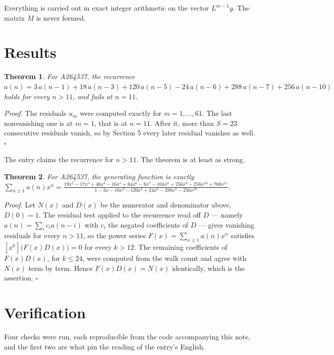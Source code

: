 \documentclass[11pt]{article}
\newtheorem{theorem}{Theorem}
\theoremstyle{definition}
\begin{document}
Everything is carried out in exact integer arithmetic on the vector $L^{m-1}y$. The matrix $M$ is never formed.

\section{Results}

\begin{theorem} For A264537, the recurrence $a(n) = 3\,a(n-1) + 18\,a(n-3) + 120\,a(n-5) - 24\,a(n-6) + 288\,a(n-7) + 256\,a(n-10)$ holds for every $n > 11$, and fails at $n = 11$.\end{theorem}

{\itshape Proof.} The residuals $u_m$ were computed exactly for $m = 1,\dots,61$. The last nonvanishing one is at $m = 1$, that is at $n = 11$. After it, more than $S = 23$ consecutive residuals vanish, so by Section 5 every later residual vanishes as well. $\square$

The entry claims the recurrence for $n > 11$. The theorem is at least as strong.

\begin{theorem} For A264537, the generating function is exactly $\sum_{n\ge 1} a(n)x^n = \frac{19x^{2} - 17x^{3} + 46x^{4} - 16x^{5} + 64x^{6} - 8x^{7} - 104x^{8} + 256x^{9} - 256x^{10} + 768x^{11}}{1 - 3x - 18x^{3} - 120x^{5} + 24x^{6} - 288x^{7} - 256x^{10}}$.\end{theorem}

{\itshape Proof.} Let $N(x)$ and $D(x)$ be the numerator and denominator above, $D(0)=1$. The residual test applied to the recurrence read off $D$ --- namely $a(n) = \sum_i c_i a(n-i)$ with $c_i$ the negated coefficients of $D$ --- gives vanishing residuals for every $n > 11$, so the power series $F(x)=\sum_{n\ge 1}a(n)x^n$ satisfies $[x^k]\bigl(F(x)D(x)\bigr) = 0$ for every $k > 12$. The remaining coefficients of $F(x)D(x)$, for $k \le 24$, were computed from the walk count and agree with $N(x)$ term by term. Hence $F(x)D(x) = N(x)$ identically, which is the assertion. $\square$

\section{Verification}

Four checks were run, each reproducible from the code accompanying this note, and the first two are what pin the reading of the entry's English.
\end{document}

